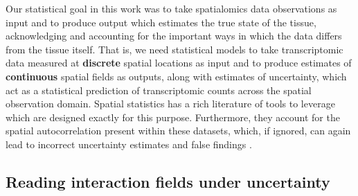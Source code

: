 \documentclass[10pt,letterpaper]{article}
\begin{document}
Our statistical goal in this work was to take spatialomics data observations as input and to produce output which estimates the true state of the tissue, acknowledging and accounting for the important ways in which the data differs from the tissue itself. That is, we need statistical models to take transcriptomic data measured at \textbf{discrete} spatial locations as input and to produce estimates of \textbf{continuous} spatial fields as outputs, along with estimates of uncertainty, which act as a statistical prediction of transcriptomic counts across the spatial observation domain. Spatial statistics has a rich literature of tools to leverage which are designed exactly for this purpose. Furthermore, they account for the spatial autocorrelation present within these datasets, which, if ignored, can again lead to incorrect uncertainty estimates and false findings \cite{cannon2001}.

\subsection*{Reading interaction fields under uncertainty}
\end{document}
